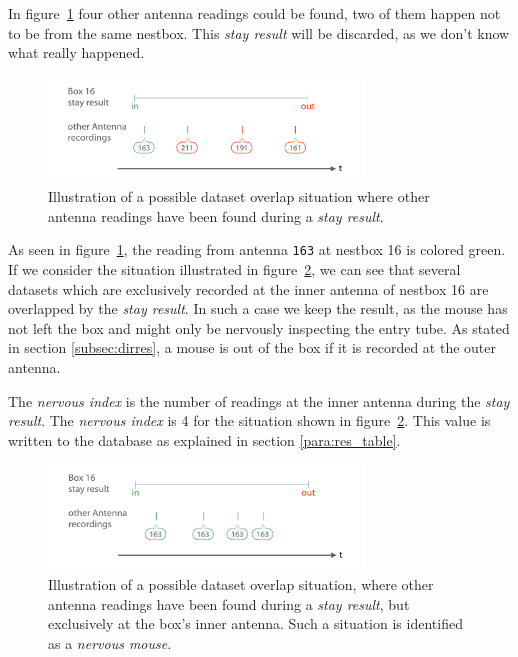 In figure~\ref{fig:dataset_overlap} four other antenna readings could be found, two of them happen not to be from the same nestbox. This \textit{stay result} will be discarded, as we don't know what really happened.

\begin{figure}[htpb]
\begin{center}
  \includegraphics[width=0.75\textwidth]{assets/pdf/dataset_overlap_schema.pdf}
  \caption[Dataset overlapping]{Illustration of a possible dataset overlap situation where other antenna readings have been found during a \textit{stay result}.}
  \label{fig:dataset_overlap}
\end{center}
\end{figure}

As seen in figure~\ref{fig:dataset_overlap}, the reading from antenna \lstinline|163| at nestbox 16 is colored green. If we consider the situation illustrated in figure~\ref{fig:dataset_overlap_nervous}, we can see that several datasets which are exclusively recorded at the inner antenna of nestbox 16 are overlapped by the \textit{stay result}. In such a case we keep the result, as the mouse has not left the box and might only be nervously inspecting the entry tube. As stated in section \ref{subsec:dirres}, a mouse is out of the box if it is recorded at the outer antenna. 

The \textit{nervous index} is the number of readings at the inner antenna during the \textit{stay result}. The \textit{nervous index} is 4 for the situation shown in figure~\ref{fig:dataset_overlap_nervous}. This value is written to the database as explained in section \ref{para:res_table}.

\begin{figure}[htpb]
\begin{center}
  \includegraphics[width=0.75\textwidth]{assets/pdf/dataset_overlap_nervous_schema.pdf}
  \caption[\textit{Nervous mouse}]{Illustration of a possible dataset overlap situation, where other antenna readings have been found during a \textit{stay result}, but exclusively at the box's inner antenna. Such a situation is identified as a \textit{nervous mouse}.}
  \label{fig:dataset_overlap_nervous}
\end{center}
\end{figure}
 
